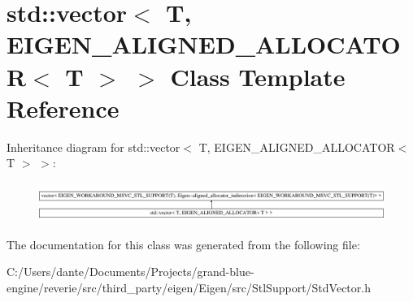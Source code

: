 \hypertarget{classstd_1_1vector_3_01_t_00_01_e_i_g_e_n___a_l_i_g_n_e_d___a_l_l_o_c_a_t_o_r_3_01_t_01_4_01_4}{}\section{std\+::vector$<$ T, E\+I\+G\+E\+N\+\_\+\+A\+L\+I\+G\+N\+E\+D\+\_\+\+A\+L\+L\+O\+C\+A\+T\+OR$<$ T $>$ $>$ Class Template Reference}
\label{classstd_1_1vector_3_01_t_00_01_e_i_g_e_n___a_l_i_g_n_e_d___a_l_l_o_c_a_t_o_r_3_01_t_01_4_01_4}
Inheritance diagram for std\+::vector$<$ T, E\+I\+G\+E\+N\+\_\+\+A\+L\+I\+G\+N\+E\+D\+\_\+\+A\+L\+L\+O\+C\+A\+T\+OR$<$ T $>$ $>$\+:\begin{figure}[H]
\begin{center}
\leavevmode
\includegraphics[height=1.271283cm]{classstd_1_1vector_3_01_t_00_01_e_i_g_e_n___a_l_i_g_n_e_d___a_l_l_o_c_a_t_o_r_3_01_t_01_4_01_4}
\end{center}
\end{figure}


The documentation for this class was generated from the following file\+:\begin{DoxyCompactItemize}
\item 
C\+:/\+Users/dante/\+Documents/\+Projects/grand-\/blue-\/engine/reverie/src/third\+\_\+party/eigen/\+Eigen/src/\+Stl\+Support/Std\+Vector.\+h\end{DoxyCompactItemize}
